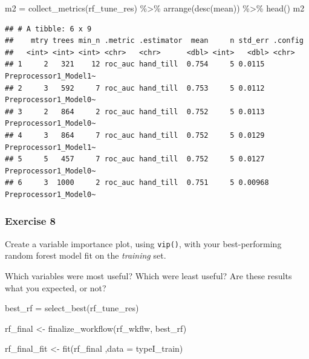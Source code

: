 \documentclass[
]{article}
\newenvironment{Shaded}{\begin{snugshade}}{\end{snugshade}}
\newcommand{\AttributeTok}[1]{\textcolor[rgb]{0.77,0.63,0.00}{#1}}
\newcommand{\FunctionTok}[1]{\textcolor[rgb]{0.00,0.00,0.00}{#1}}
\newcommand{\NormalTok}[1]{#1}
\newcommand{\OtherTok}[1]{\textcolor[rgb]{0.56,0.35,0.01}{#1}}
\newcommand{\SpecialCharTok}[1]{\textcolor[rgb]{0.00,0.00,0.00}{#1}}
\begin{document}
\begin{Shaded}
\begin{Highlighting}[]
\NormalTok{m2 }\OtherTok{=} \FunctionTok{collect\_metrics}\NormalTok{(rf\_tune\_res) }\SpecialCharTok{\%\textgreater{}\%} \FunctionTok{arrange}\NormalTok{(}\FunctionTok{desc}\NormalTok{(mean)) }\SpecialCharTok{\%\textgreater{}\%} \FunctionTok{head}\NormalTok{()}
\NormalTok{m2 }
\end{Highlighting}
\end{Shaded}

\begin{verbatim}
## # A tibble: 6 x 9
##    mtry trees min_n .metric .estimator  mean     n std_err .config              
##   <int> <int> <int> <chr>   <chr>      <dbl> <int>   <dbl> <chr>                
## 1     2   321    12 roc_auc hand_till  0.754     5 0.0115  Preprocessor1_Model1~
## 2     3   592     7 roc_auc hand_till  0.753     5 0.0112  Preprocessor1_Model0~
## 3     2   864     2 roc_auc hand_till  0.752     5 0.0113  Preprocessor1_Model0~
## 4     3   864     7 roc_auc hand_till  0.752     5 0.0129  Preprocessor1_Model1~
## 5     5   457     7 roc_auc hand_till  0.752     5 0.0127  Preprocessor1_Model0~
## 6     3  1000     2 roc_auc hand_till  0.751     5 0.00968 Preprocessor1_Model0~
\end{verbatim}

\hypertarget{exercise-8}{%
\subsubsection{Exercise 8}\label{exercise-8}}

Create a variable importance plot, using \texttt{vip()}, with your
best-performing random forest model fit on the \emph{training} set.

Which variables were most useful? Which were least useful? Are these
results what you expected, or not?

\begin{Shaded}
\begin{Highlighting}[]
\NormalTok{best\_rf }\OtherTok{=} \FunctionTok{select\_best}\NormalTok{(rf\_tune\_res)}

\NormalTok{rf\_final }\OtherTok{\textless{}{-}} \FunctionTok{finalize\_workflow}\NormalTok{(rf\_wkflw, best\_rf)}

\NormalTok{rf\_final\_fit }\OtherTok{\textless{}{-}} \FunctionTok{fit}\NormalTok{(rf\_final ,}\AttributeTok{data =}\NormalTok{ typeI\_train)}
\end{Highlighting}
\end{Shaded}
\end{document}
